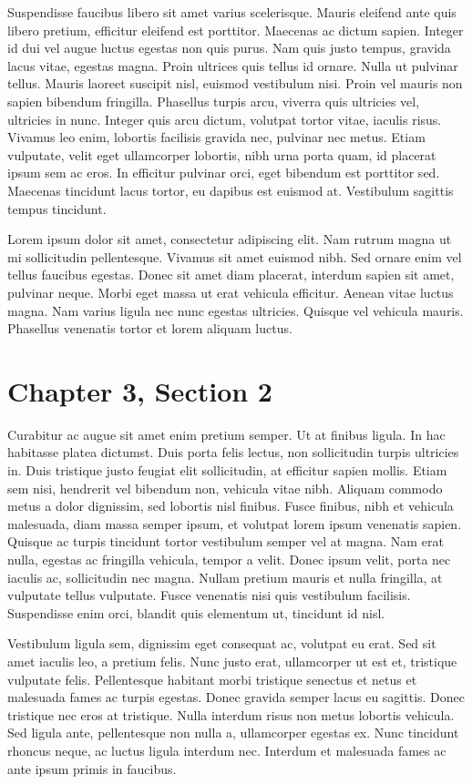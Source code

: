Suspendisse faucibus libero sit amet varius scelerisque. Mauris eleifend ante quis libero pretium, efficitur eleifend est porttitor. Maecenas ac dictum sapien. Integer id dui vel augue luctus egestas non quis purus. Nam quis justo tempus, gravida lacus vitae, egestas magna. Proin ultrices quis tellus id ornare. Nulla ut pulvinar tellus. Mauris laoreet suscipit nisl, euismod vestibulum nisi. Proin vel mauris non sapien bibendum fringilla. Phasellus turpis arcu, viverra quis ultricies vel, ultricies in nunc. Integer quis arcu dictum, volutpat tortor vitae, iaculis risus. Vivamus leo enim, lobortis facilisis gravida nec, pulvinar nec metus. Etiam vulputate, velit eget ullamcorper lobortis, nibh urna porta quam, id placerat ipsum sem ac eros. In efficitur pulvinar orci, eget bibendum est porttitor sed. Maecenas tincidunt lacus tortor, eu dapibus est euismod at. Vestibulum sagittis tempus tincidunt. 

Lorem ipsum dolor sit amet, consectetur adipiscing elit. Nam rutrum magna ut mi sollicitudin pellentesque. Vivamus sit amet euismod nibh. Sed ornare enim vel tellus faucibus egestas. Donec sit amet diam placerat, interdum sapien sit amet, pulvinar neque. Morbi eget massa ut erat vehicula efficitur. Aenean vitae luctus magna. Nam varius ligula nec nunc egestas ultricies. Quisque vel vehicula mauris. Phasellus venenatis tortor et lorem aliquam luctus.

\section{Chapter 3, Section 2}

Curabitur ac augue sit amet enim pretium semper. Ut at finibus ligula. In hac habitasse platea dictumst. Duis porta felis lectus, non sollicitudin turpis ultricies in. Duis tristique justo feugiat elit sollicitudin, at efficitur sapien mollis. Etiam sem nisi, hendrerit vel bibendum non, vehicula vitae nibh. Aliquam commodo metus a dolor dignissim, sed lobortis nisl finibus. Fusce finibus, nibh et vehicula malesuada, diam massa semper ipsum, et volutpat lorem ipsum venenatis sapien. Quisque ac turpis tincidunt tortor vestibulum semper vel at magna. Nam erat nulla, egestas ac fringilla vehicula, tempor a velit. Donec ipsum velit, porta nec iaculis ac, sollicitudin nec magna. Nullam pretium mauris et nulla fringilla, at vulputate tellus vulputate. Fusce venenatis nisi quis vestibulum facilisis. Suspendisse enim orci, blandit quis elementum ut, tincidunt id nisl.

Vestibulum ligula sem, dignissim eget consequat ac, volutpat eu erat. Sed sit amet iaculis leo, a pretium felis. Nunc justo erat, ullamcorper ut est et, tristique vulputate felis. Pellentesque habitant morbi tristique senectus et netus et malesuada fames ac turpis egestas. Donec gravida semper lacus eu sagittis. Donec tristique nec eros at tristique. Nulla interdum risus non metus lobortis vehicula. Sed ligula ante, pellentesque non nulla a, ullamcorper egestas ex. Nunc tincidunt rhoncus neque, ac luctus ligula interdum nec. Interdum et malesuada fames ac ante ipsum primis in faucibus.

